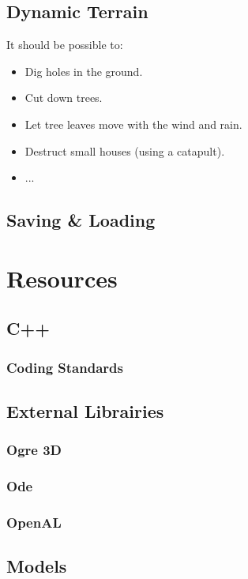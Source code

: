 \documentclass[a4paper]{report}
\begin{document}
	\chapter{Dynamic Terrain}

		It should be possible to:
		\begin{itemize}
			\item Dig holes in the ground.
			\item Cut down trees.
			\item Let tree leaves move with the wind and rain.
			\item Destruct small houses (using a catapult).
			\item ...
		\end{itemize}

	\chapter{Saving \& Loading}

\part{Resources}

	\chapter{C++}

		\section{Coding Standards}

	\chapter{External Librairies}

		\section{Ogre 3D}

		\section{Ode}

		\section{OpenAL}

	\chapter{Models}
\end{document}
